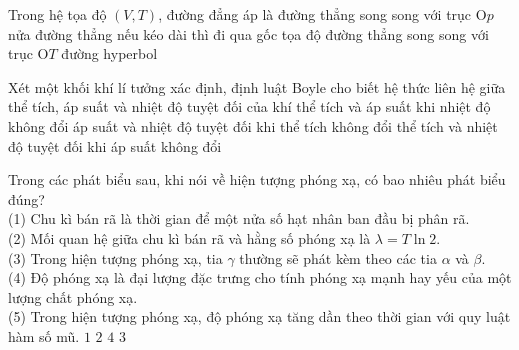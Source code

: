 	\begin{ex}%
		Trong hệ tọa độ $(V,T)$, đường đẳng áp là
		\choice
		{đường thẳng song song với trục O$p$}
		{\True nửa đường thẳng nếu kéo dài thì đi qua gốc tọa độ}
		{đường thẳng song song với trục O$T$}
		{đường hyperbol}
	\end{ex}

	\begin{ex}%
		Xét một khối khí lí tưởng xác định, định luật Boyle cho biết hệ thức liên hệ giữa
		\choice
		{thể tích, áp suất và nhiệt độ tuyệt đối của khí}
		{\True thể tích và áp suất khi nhiệt độ không đổi}
		{áp suất và nhiệt độ tuyệt đối khi thể tích không đổi}
		{thể tích và nhiệt độ tuyệt đối khi áp suất không đổi}
	\end{ex}

	\begin{ex}%
		Trong các phát biểu sau, khi nói về hiện tượng phóng xạ, có bao nhiêu phát biểu đúng?\\
		(1) Chu kì bán rã là thời gian để một nửa số hạt nhân ban đầu bị phân rã.\\
		(2) Mối quan hệ giữa chu kì bán rã và hằng số phóng xạ là $\lambda=T\ln 2$.\\
		(3) Trong hiện tượng phóng xạ, tia $\gamma$ thường sẽ phát kèm theo các tia $\alpha$ và $\beta$.\\
		(4) Độ phóng xạ là đại lượng đặc trưng cho tính phóng xạ mạnh hay yếu của một lượng chất phóng xạ.\\
		(5) Trong hiện tượng phóng xạ, độ phóng xạ tăng dần theo thời gian với quy luật hàm số mũ.
		\choice
		{$1$}
		{$2$}
		{$4$}
		{\True $3$}
	\end{ex}

